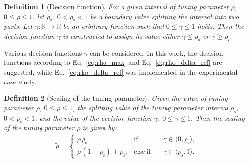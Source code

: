 \documentclass[preprint,12pt]{elsarticle}
\newtheorem{definition}{Definition}[section]
\begin{document}
	\begin{definition}[Decision function]
		\label{def:gamma}
		For a given interval of tuning parameter $\rho$, $0 \leq \rho \leq 1$, let $\rho_{\mathrm{s}}$, $0 < \rho_{\mathrm{s}} < 1$ be a boundary value splitting the interval into two parts. Let $\gamma: \mathbb{R} \rightarrow \mathbb{R}$ be an arbitrary function such that $0 \leq \gamma \leq 1$ holds. Then the decision function $\gamma$ is constructed to assign its value either $\gamma \leq \rho_{\mathrm{s}}$ or $\gamma \ge \rho_{\mathrm{s}}$.
	\end{definition}
	Various decision functions $\gamma$ can be considered. In this work, the decision functions according to Eq.~\eqref{eq:rho_max} and Eq.~\eqref{eq:rho_delta_ref} are suggested, while Eq.~\eqref{eq:rho_delta_ref} was implemented in the experimental case study.
	
	\begin{definition}[Scaling of the tuning parameter]
		\label{def:rho_tilde}
		Given the value of tuning parameter $\rho$, $0 \leq \rho \leq 1$, the splitting value of the tuning parameter interval $\rho_{\mathrm{s}}$, $0 < \rho_{\mathrm{s}} < 1$, and the value of the decision function $\gamma$, $0 \leq \gamma \leq 1$. Then the scaling of the tuning parameter $\widetilde{\rho}$ is given by:		
		\begin{eqnarray}
			\label{eq:rho_tilde_def}
			\widetilde{\rho} = \left\{ 
			\begin{matrix}
				\rho \, \rho_{\mathrm{s}} & \mathrm{if} & \quad \gamma \in \langle 0, \rho_{\mathrm{s}} \rangle , \\
				\rho \, (1-\rho_{\mathrm{s}}) + \rho_{\mathrm{s}}, & \mathrm{else}\,\,\mathrm{if} &\quad \gamma \in \langle \rho_{\mathrm{s}}, 1 \rangle.
			\end{matrix}
			\right.
		\end{eqnarray}
	\end{definition}
	
	
\end{document}
